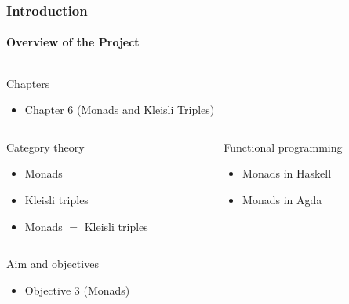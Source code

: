 \documentclass{beamer}
\begin{document}

\begin{frame}[label={chap:monads}]
  \frametitle{Introduction}
  \framesubtitle{Overview of the Project}

  \begin{columns}[onlytextwidth,t]
    \begin{column}{\textwidth}
      \begin{block}{Chapters}
        \begin{itemize}
        \item Chapter 6 (Monads and Kleisli Triples)
        \end{itemize}
      \end{block}
    \end{column}
  \end{columns}
  \begin{columns}[onlytextwidth,t]
    \begin{column}{.5\textwidth}
      \begin{block}{Category theory}
        \begin{itemize}
        \item Monads
        \item Kleisli triples
        \item Monads $=$ Kleisli triples
        \end{itemize}
      \end{block}
    \end{column}
    \begin{column}{.5\textwidth}
      \begin{block}{Functional programming}
        \begin{itemize}
        \item Monads in Haskell
        \item Monads in Agda
        \end{itemize}
      \end{block}
    \end{column}
  \end{columns}
  \begin{columns}[onlytextwidth,t]
    \begin{column}{\textwidth}
      \begin{block}{Aim and objectives}
        \begin{itemize}
        \item Objective 3 (Monads)
        \end{itemize}
      \end{block}
    \end{column}
  \end{columns}

\end{frame}
\end{document}
